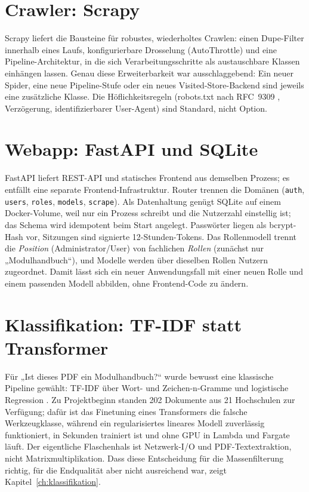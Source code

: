 \section{Crawler: Scrapy}
Scrapy liefert die Bausteine für robustes, wiederholtes Crawlen: einen Dupe-Filter innerhalb eines Laufs, konfigurierbare Drosselung (AutoThrottle) und eine Pipeline-Architektur, in die sich Verarbeitungsschritte als austauschbare Klassen einhängen lassen. Genau diese Erweiterbarkeit war ausschlaggebend: Ein neuer Spider, eine neue Pipeline-Stufe oder ein neues Visited-Store-Backend sind jeweils eine zusätzliche Klasse. Die Höflichkeitsregeln (robots.txt nach RFC~9309 \citep{rfc9309}, Verzögerung, identifizierbarer User-Agent) sind Standard, nicht Option.

\section{Webapp: FastAPI und SQLite}
FastAPI liefert REST-API und statisches Frontend aus demselben Prozess; es entfällt eine separate Frontend-Infrastruktur. Router trennen die Domänen (\texttt{auth}, \texttt{users}, \texttt{roles}, \texttt{models}, \texttt{scrape}). Als Datenhaltung genügt SQLite auf einem Docker-Volume, weil nur ein Prozess schreibt und die Nutzerzahl einstellig ist; das Schema wird idempotent beim Start angelegt. Passwörter liegen als bcrypt-Hash vor, Sitzungen sind signierte 12-Stunden-Tokens. Das Rollenmodell trennt die \emph{Position} (Administrator/User) von fachlichen \emph{Rollen} (zunächst nur „Modulhandbuch“), und Modelle werden über dieselben Rollen Nutzern zugeordnet. Damit lässt sich ein neuer Anwendungsfall mit einer neuen Rolle und einem passenden Modell abbilden, ohne Frontend-Code zu ändern.

\section{Klassifikation: TF-IDF statt Transformer}
Für „Ist dieses PDF ein Modulhandbuch?“ wurde bewusst eine klassische Pipeline gewählt: TF-IDF \citep{salton1988} über Wort- und Zeichen-n-Gramme und logistische Regression \citep{pedregosa2011}. Zu Projektbeginn standen 202 Dokumente aus 21 Hochschulen zur Verfügung; dafür ist das Finetuning eines Transformers die falsche Werkzeugklasse, während ein regularisiertes lineares Modell zuverlässig funktioniert, in Sekunden trainiert ist und ohne GPU in Lambda und Fargate läuft. Der eigentliche Flaschenhals ist Netzwerk-I/O und PDF-Textextraktion, nicht Matrixmultiplikation. Dass diese Entscheidung für die Massenfilterung richtig, für die Endqualität aber nicht ausreichend war, zeigt Kapitel~\ref{ch:klassifikation}.

